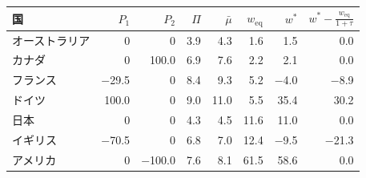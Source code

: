 \begin{tabular}{lrrrrrrr}
\toprule
国 & $P_{1}$ & $P_{2}$ & $\Pi$ & $\bar\mu$ & $w_{\mathrm{eq}}$ & $w^*$ & $w^* - \frac{w_{\mathrm{eq}}}{1+\tau}$ \\
\midrule
オーストラリア & 0 & 0 & 3.9 & 4.3 & 1.6 & 1.5 & 0.0 \\
カナダ & 0 & 100.0 & 6.9 & 7.6 & 2.2 & 2.1 & 0.0 \\
フランス & \ensuremath{-}29.5 & 0 & 8.4 & 9.3 & 5.2 & \ensuremath{-}4.0 & \ensuremath{-}8.9 \\
ドイツ & 100.0 & 0 & 9.0 & 11.0 & 5.5 & 35.4 & 30.2 \\
日本 & 0 & 0 & 4.3 & 4.5 & 11.6 & 11.0 & 0.0 \\
イギリス & \ensuremath{-}70.5 & 0 & 6.8 & 7.0 & 12.4 & \ensuremath{-}9.5 & \ensuremath{-}21.3 \\
アメリカ & 0 & \ensuremath{-}100.0 & 7.6 & 8.1 & 61.5 & 58.6 & 0.0 \\
\bottomrule
\end{tabular}
